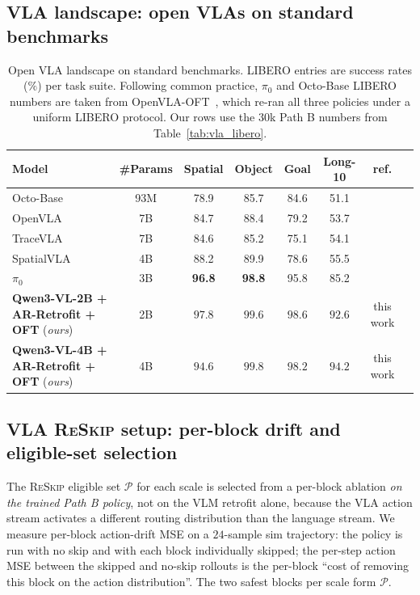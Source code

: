 \documentclass{article}
\newcommand{\reskip}{\textsc{ReSkip}}
\begin{document}
\subsection{VLA landscape: open VLAs on standard benchmarks}
\label{app:vla_landscape}
\begin{table}[h]
\caption{Open VLA landscape on standard benchmarks. LIBERO entries are success rates ($\%$) per task suite. Following common practice, $\pi_0$ and Octo-Base LIBERO numbers are taken from OpenVLA-OFT~\citep{kim2025openvlaoft}, which re-ran all three policies under a uniform LIBERO protocol. Our rows use the $30$k Path B numbers from Table~\ref{tab:vla_libero}.}
\label{tab:vla_landscape}
\centering\small
\setlength{\tabcolsep}{4pt}
\begin{tabular}{lccccccc}
\toprule
Model & \#Params & Spatial & Object & Goal & Long-10 & ref. \\
\midrule
Octo-Base    & 93M & 78.9 & 85.7 & 84.6 & 51.1 & \citep{team2024octo, kim2025openvlaoft} \\
OpenVLA      & 7B  & 84.7 & 88.4 & 79.2 & 53.7 & \citep{kim2024openvla, kim2025openvlaoft} \\
TraceVLA     & 7B  & 84.6 & 85.2 & 75.1 & 54.1 & \citep{zheng2024tracevla} \\
SpatialVLA   & 4B  & 88.2 & 89.9 & 78.6 & 55.5 & \citep{qu2025spatialvla} \\
$\pi_0$      & 3B  & \textbf{96.8} & \textbf{98.8} & 95.8 & 85.2 & \citep{black2024pi0, kim2025openvlaoft} \\
\midrule
\rowcolor{black!6}
\textbf{Qwen3-VL-2B + AR-Retrofit + OFT} (\emph{ours}) & 2B & $\mathbf{97.8}$ & $99.6$ & $\mathbf{98.6}$ & $92.6$ & this work \\
\rowcolor{black!6}
\textbf{Qwen3-VL-4B + AR-Retrofit + OFT} (\emph{ours}) & 4B & $94.6$ & $\mathbf{99.8}$ & $\mathbf{98.2}$ & $\mathbf{94.2}$ & this work \\
\bottomrule
\end{tabular}
\end{table}

\subsection{VLA \reskip{} setup: per-block drift and eligible-set selection}
\label{app:vla_pareto}

The \reskip{} eligible set $\mathcal{P}$ for each scale is selected from a per-block ablation \emph{on the trained Path B policy}, not on the VLM retrofit alone, because the VLA action stream activates a different routing distribution than the language stream. We measure per-block action-drift MSE on a $24$-sample sim trajectory: the policy is run with no skip and with each block individually skipped; the per-step action MSE between the skipped and no-skip rollouts is the per-block ``cost of removing this block on the action distribution''. The two safest blocks per scale form $\mathcal{P}$.
\end{document}
